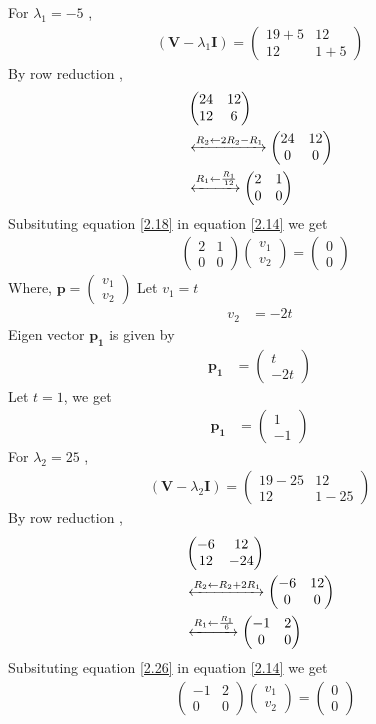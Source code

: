 \documentclass[journal,12pt,twocolumn]{IEEEtran}
\let\vec\mathbf
\numberwithin{equation}{subsection}
\newcommand{\myvec}[1]{\ensuremath{\begin{pmatrix}#1\end{pmatrix}}}
\begin{document}
For $\lambda_1=-5$ ,
\begin{align}
    (\vec{V}-\lambda_1\vec{I})=\myvec{19+5 & 12 \\12 & 1+5}
\end{align}
By row reduction , 
\begin{align}
    &\myvec{24 & 12 \\12 & 6}\\
&\xleftrightarrow{R_2\leftarrow 2R_2 -R_1}
    \myvec{24 & 12 \\ 0& 0}\\
        &\xleftrightarrow{R_1\leftarrow \frac{R_1}{12}}
    \myvec{2 & 1 \\ 0& 0}
    \label{2.18}
\end{align}
Subsituting equation \ref{2.18} in equation \ref{2.14} we get
\begin{align}
        &   \myvec{2 & 1 \\ 0& 0}\myvec{v_1 \\ v_2}=\myvec{0 \\ 0}\label{2.19}
\end{align}
Where, $\vec{p}=\myvec{v_1\\v_2}$
Let $v_1=t$
\begin{align}
    v_2&=-2t
\end{align}
Eigen vector $\vec{p_1}$ is given by
\begin{align}
    \vec{p_1}&=\myvec{t \\ -2t}
\end{align}
Let $t=1$, we get
\begin{align}
        \vec{p_1}&=\myvec{1 \\-1 }\label{2.22}
\end{align}
For $\lambda_2=25$ ,
\begin{align}
    (\vec{V}-\lambda_2\vec{I})=\myvec{19-25 & 12 \\12 & 1-25}
\end{align}
By row reduction , 
\begin{align}
    &\myvec{-6 & 12 \\12 & -24}\\
&\xleftrightarrow{R_2\leftarrow R_2 +2R_1}
    \myvec{-6 & 12 \\ 0& 0}\\
        &\xleftrightarrow{R_1\leftarrow \frac{R_1}{6}}
    \myvec{-1 & 2 \\ 0& 0}
    \label{2.26}
\end{align}
Subsituting equation \ref{2.26} in equation \ref{2.14} we get
\begin{align}
        &   \myvec{-1 & 2 \\ 0& 0}\myvec{v_1 \\ v_2}=\myvec{0 \\ 0}\label{2.27}
\end{align}
\end{document}
